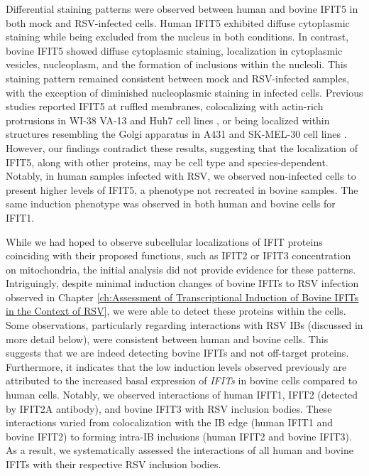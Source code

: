 Differential staining patterns were observed between human and bovine IFIT5 in both mock and RSV-infected cells. Human IFIT5 exhibited diffuse cytoplasmic staining while being excluded from the nucleus in both conditions. In contrast, bovine IFIT5 showed diffuse cytoplasmic staining, localization in cytoplasmic vesicles, nucleoplasm, and the formation of inclusions within the nucleoli. This staining pattern remained consistent between mock and RSV-infected samples, with the exception of diminished nucleoplasmic staining in infected cells. Previous studies reported IFIT5 at ruffled membranes, colocalizing with actin-rich protrusions in WI-38 VA-13 and Huh7 cell lines \cite{Katibah2013TRNAIFIT5}, or being localized within structures resembling the Golgi apparatus in A431 and SK-MEL-30 cell lines \cite{Thul2017AProteome}. However, our findings contradict these results, suggesting that the localization of IFIT5, along with other proteins, may be cell type and species-dependent. Notably, in human samples infected with RSV, we observed non-infected cells to present higher levels of IFIT5, a phenotype not recreated in bovine samples. The same induction phenotype was observed in both human and bovine cells for IFIT1.

While we had hoped to observe subcellular localizations of IFIT proteins coinciding with their proposed functions, such as IFIT2 or IFIT3 concentration on mitochondria, the initial analysis did not provide evidence for these patterns. Intriguingly, despite minimal induction changes of bovine IFITs to RSV infection observed in Chapter \ref{ch:Assessment of Transcriptional Induction of Bovine IFITs in the Context of RSV}, we were able to detect these proteins within the cells. Some observations, particularly regarding interactions with RSV IBs (discussed in more detail below), were consistent between human and bovine cells. This suggests that we are indeed detecting bovine IFITs and not off-target proteins. Furthermore, it indicates that the low induction levels observed previously are attributed to the increased basal expression of \textit{IFITs} in bovine cells compared to human cells. Notably, we observed interactions of human IFIT1, IFIT2 (detected by IFIT2A antibody), and bovine IFIT3 with RSV inclusion bodies. These interactions varied from colocalization with the IB edge (human IFIT1 and bovine IFIT2) to forming intra-IB inclusions (human IFIT2 and bovine IFIT3). As a result, we systematically assessed the interactions of all human and bovine IFITs with their respective RSV inclusion bodies.

